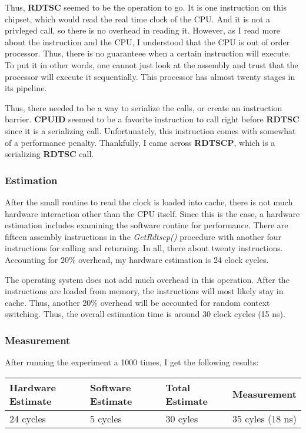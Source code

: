 \documentclass[paper=a4, fontsize=11pt]{scrartcl}
\numberwithin{equation}{section}        %
\numberwithin{figure}{section}          %
\numberwithin{table}{section}               %
\begin{document}
Thus, \textbf{RDTSC} seemed to be the operation to go.  It is one instruction on this chipset, which would read the real time clock of the CPU.  And it is not a privleged call, so there is no overhead in reading it.  However, as I read more about the instruction and the CPU, I understood that the CPU is out of order processor.  Thus, there is no guaranteee when a certain instruction will execute.  To put it in other words, one cannot just look at the assembly and trust that the processor will execute it sequentially.  This processor has almost twenty stages in its pipeline.

Thus, there needed to be a way to serialize the calls, or create an instruction barrier.  \textbf{CPUID} seemed to be a favorite instruction to call right before \textbf{RDTSC} since it is a serializing call.  Unfortunately, this instruction comes with somewhat of a performance penalty.  Thankfully, I came across \textbf{RDTSCP}, which is a serializing \textbf{RDTSC} call.

\subsubsection{Estimation}

After the small routine to read the clock is loaded into cache, there is not much hardware interaction other than the CPU itself.  Since this is the case, a hardware estimation includes examining the software routine for performance.  There are fifteen assembly instructions in the \textit{GetRdtscp()} procedure with another four instructions for calling and returning.  In all, there about twenty instructions.  Accounting for 20\% overhead, my hardware estimation is 24 clock cycles.

The operating system does not add much overhead in this operation.  After the instructions are loaded from memory, the instructions will most likely stay in cache.  Thus, another 20\% overhead will be accounted for random context switching.  Thus, the overall estimation time is around 30 clock cycles (15 ns).

\subsubsection{Measurement}

After running the experiment a 1000 times, I get the following results:

\begin{center}
    \begin{tabular}{ | l | l | l | p{5cm} |}
    \hline
    Hardware Estimate & Software Estimate & Total Estimate & Measurement \\ \hline
    24 cycles & 5 cycles & 30 cyles & 35 cyles (18 ns) \\ 
    \hline
    \end{tabular}
\end{center}
\end{document}
